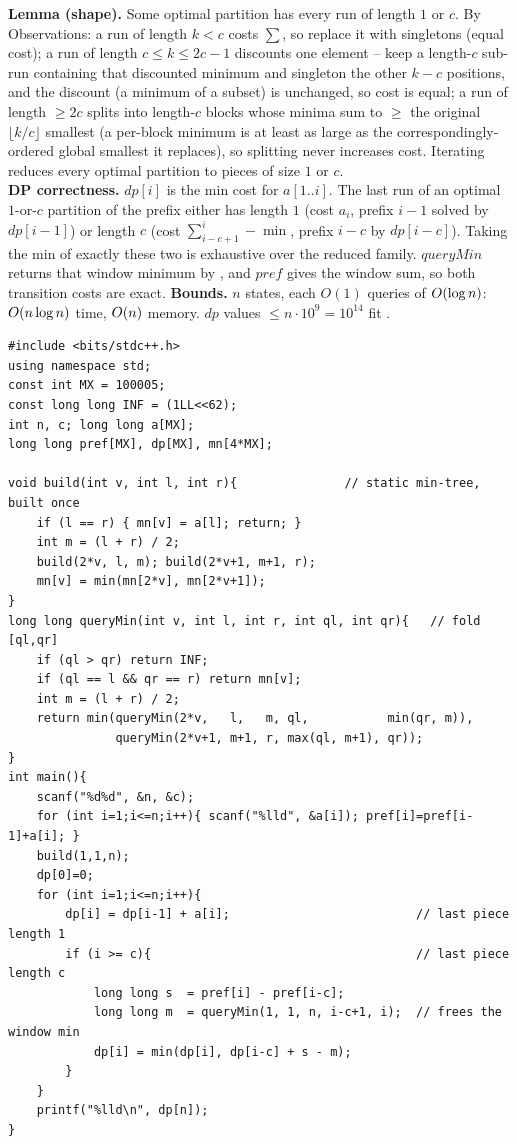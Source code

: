 \begin{proofbox}
\textbf{Lemma (shape).} Some optimal partition has every run of length \(1\) or
\(c\).  By Observations: a run of length \(k<c\) costs \(\sum\), so replace it
with singletons (equal cost); a run of length \(c\le k\le 2c{-}1\) discounts one
element -- keep a length-\(c\) sub-run containing that discounted minimum and
singleton the other \(k-c\) positions, and the discount (a minimum of a subset)
is unchanged, so cost is equal; a run of length \(\ge 2c\) splits into length-\(c\)
blocks whose minima sum to \(\ge\) the original \(\lfloor k/c\rfloor\) smallest
(a per-block minimum is at least as large as the correspondingly-ordered global
smallest it replaces), so splitting never increases cost.  Iterating reduces every
optimal partition to pieces of size \(1\) or \(c\).\\
\textbf{DP correctness.} \(\mathit{dp}[i]\) is the min cost for \(a[1..i]\).  The
last run of an optimal \(1\)-or-\(c\) partition of the prefix either has length
\(1\) (cost \(a_i\), prefix \(i{-}1\) solved by \(\mathit{dp}[i{-}1]\)) or length
\(c\) (cost \(\sum_{i-c+1}^{i}-\min\), prefix \(i{-}c\) by \(\mathit{dp}[i{-}c]\)).
Taking the min of exactly these two is exhaustive over the reduced family.
\(\mathit{queryMin}\) returns that window minimum by , and
\(\mathit{pref}\) gives the window sum, so both transition costs are exact.
\textbf{Bounds.} \(n\) states, each \(O(1)\) queries of \(O(\log n)\):
\(O(n\log n)\) time, \(O(n)\) memory.  \(\mathit{dp}\) values \(\le n\cdot
10^9=10^{14}\) fit .
\end{proofbox}

\begin{lstlisting}[caption={CF 940E full solution: static range-min tree + prefix sums + the length-1-or-c DP}, label={lst:c13-940-soln}]
#include <bits/stdc++.h>
using namespace std;
const int MX = 100005;
const long long INF = (1LL<<62);
int n, c; long long a[MX];
long long pref[MX], dp[MX], mn[4*MX];

void build(int v, int l, int r){               // static min-tree, built once
    if (l == r) { mn[v] = a[l]; return; }
    int m = (l + r) / 2;
    build(2*v, l, m); build(2*v+1, m+1, r);
    mn[v] = min(mn[2*v], mn[2*v+1]);
}
long long queryMin(int v, int l, int r, int ql, int qr){   // fold [ql,qr]
    if (ql > qr) return INF;
    if (ql == l && qr == r) return mn[v];
    int m = (l + r) / 2;
    return min(queryMin(2*v,   l,   m, ql,           min(qr, m)),
               queryMin(2*v+1, m+1, r, max(ql, m+1), qr));
}
int main(){
    scanf("%d%d", &n, &c);
    for (int i=1;i<=n;i++){ scanf("%lld", &a[i]); pref[i]=pref[i-1]+a[i]; }
    build(1,1,n);
    dp[0]=0;
    for (int i=1;i<=n;i++){
        dp[i] = dp[i-1] + a[i];                          // last piece length 1
        if (i >= c){                                     // last piece length c
            long long s  = pref[i] - pref[i-c];
            long long m  = queryMin(1, 1, n, i-c+1, i);  // frees the window min
            dp[i] = min(dp[i], dp[i-c] + s - m);
        }
    }
    printf("%lld\n", dp[n]);
}
\end{lstlisting}

